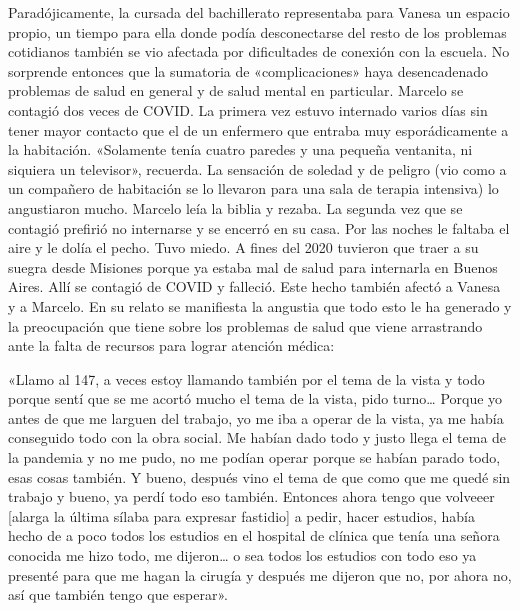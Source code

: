 \begin{refsection}
\begin{gbcita}
\end{gbcita}

Paradójicamente, la cursada del bachillerato representaba para Vanesa un espacio propio, un tiempo para ella donde podía desconectarse del resto de los problemas cotidianos también se vio afectada por dificultades de conexión con la escuela. No sorprende entonces que la sumatoria de «complicaciones» haya desencadenado problemas de salud en general y de salud mental en particular. Marcelo se contagió dos veces de COVID. La primera vez estuvo internado varios días sin tener mayor contacto que el de un enfermero que entraba muy esporádicamente a la habitación. «Solamente tenía cuatro paredes y una pequeña ventanita, ni siquiera un televisor», recuerda. La sensación de soledad y de peligro (vio como a un compañero de habitación se lo llevaron para una sala de terapia intensiva) lo angustiaron mucho. Marcelo leía la biblia y rezaba. La segunda vez que se contagió prefirió no internarse y se encerró en su casa. Por las noches le faltaba el aire y le dolía el pecho. Tuvo miedo. A fines del 2020 tuvieron que traer a su suegra desde Misiones porque ya estaba mal de salud para internarla en Buenos Aires. Allí se contagió de COVID y falleció. Este hecho también afectó a Vanesa y a Marcelo. En su relato se manifiesta la angustia que todo esto le ha generado y la preocupación que tiene sobre los problemas de salud que viene arrastrando ante la falta de recursos para lograr atención médica:


\begin{gbcita}
«Llamo al 147, a veces estoy llamando también por el tema de la vista y todo porque sentí que se me acortó mucho el tema de la vista, pido turno… Porque yo antes de que me larguen del trabajo, yo me iba a operar de la vista, ya me había conseguido todo con la obra social. Me habían dado todo y justo llega el tema de la pandemia y no me pudo, no me podían operar porque se habían parado todo, esas cosas también. Y bueno, después vino el tema de que como que me quedé sin trabajo y bueno, ya perdí todo eso también. Entonces ahora tengo que volveeer [alarga la última sílaba para expresar fastidio] a pedir, hacer estudios, había hecho de a poco todos los estudios en el hospital de clínica que tenía una señora conocida me hizo todo, me dijeron… o sea todos los estudios con todo eso ya presenté para que me hagan la cirugía y después me dijeron que no, por ahora no, así que también tengo que esperar».

\end{gbcita}


\end{refsection}
